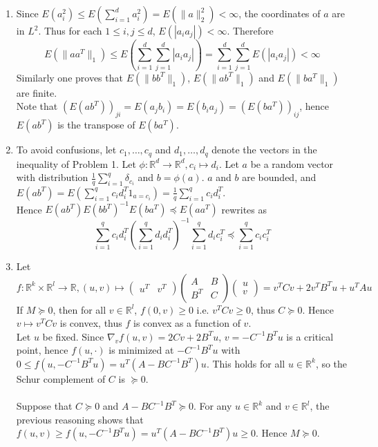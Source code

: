 \documentclass[a4paper,11pt]{article}
\begin{document}
\begin{enumerate}
  \item Since $E(a_i^2) \leq E(\sum_{i=1}^d a_i^2) = E(\|a\|_2^2) < \infty$, the coordinates of $a$ are in $L^2$. Thus for each $1\leq i,j\leq d$, $E(|a_i a_j|)<\infty$. Therefore $$E(\|aa^T\|_1) \leq E\left(\sum_{i=1}^d \sum_{j=1}^d |a_i a_j| \right) = \sum_{i=1}^d \sum_{j=1}^d E(|a_i a_j|)<\infty$$
  Similarly one proves that $E(\|bb^T\|_1)$, $E(\|ab^T\|_1)$ and $E(\|ba^T\|_1)$ are finite.\\
  Note that $(E(ab^T))_{ji} = E(a_j b_i) = E(b_ia_j) = (E(ba^T))_{ij}$, hence $E(ab^T)$ is the transpose of $E(ba^T)$.

  \item To avoid confusions, let $c_1,\ldots, c_q$ and $d_1,\ldots, d_q$ denote the vectors in the inequality of Problem 1. Let $\phi: \mathbb R^d\to \mathbb R^d, c_i \mapsto d_i$. Let $a$ be a random vector with distribution $\frac 1q \sum_{i=1}^q \delta_{c_i}$ and $b=\phi(a)$. $a$ and $b$ are bounded, and $E(ab^T) = E\left(\sum_{i=1}^q c_i d_i^T 1_{a=c_i}\right) = \frac 1q \sum_{i=1}^q  c_i d_i^T$.\\
  Hence $E(ab^T) E(bb^T)^{-1} E(ba^T) \preceq E(aa^T)$ rewrites as 
  $$\sum_{i=1}^q c_i d_i^T \left(\sum_{i=1}^q d_i d_i^T\right)^{-1} \sum_{i=1}^q d_i c_i^T \preceq \sum_{i=1}^q c_i c_i^T$$

  \item Let $f:\mathbb R^k\times \mathbb R^l\to \mathbb R, (u,v)\mapsto \begin{pmatrix}u^T & v^T \end{pmatrix} \begin{pmatrix}
        A & B \\
        B^T & C\end{pmatrix} \begin{pmatrix}u \\ v \end{pmatrix} = v^TCv + 2v^TB^Tu + u^TAu$\\
  If $M\succeq 0$, then for all $v\in \mathbb R^l$, $f(0,v)\geq 0$ i.e. $v^TCv \geq 0$, thus $C\succeq 0$.
  Hence $v\mapsto v^TCv$ is convex, thus $f$ is convex as a function of $v$.\\
  Let $u$ be fixed. Since $\nabla_v f(u,v) = 2Cv + 2B^Tu$, $v=-C^{-1}B^Tu$ is a critical point, hence $f(u,\cdot)$ is minimized at $-C^{-1}B^Tu$ with $0\leq f(u,-C^{-1}B^Tu) = u^T(A-BC^{-1}B^T)u$. This holds for all $u\in \mathbb R^k$, so the Schur complement of $C$ is $\succeq 0$.\\
  \\
  Suppose that $C\succeq 0$ and $A-BC^{-1}B^T\succeq 0$. For any $u\in \mathbb R^k$ and $v\in \mathbb R^l$, the previous reasoning shows that $f(u,v)\geq f(u,-C^{-1}B^Tu) = u^T(A-BC^{-1}B^T)u \geq 0$. Hence $M\succeq 0$.


\end{enumerate}
\end{document}
